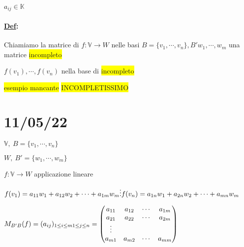 \documentclass{article}
\newcommand{\hl}[1]{\colorbox{yellow}{#1}}
\newcommand{\ul}[1]{\underline{#1}}
\newcommand{\K}{\mathbb{K}}
\newcommand{\V}{\mathbb{V}}
\newcommand{\Def}[2]{\paragraph{\ul{Def}:}#1\\\hspace*{3em}\begin{minipage}{.8\textwidth}#2\end{minipage}}
\begin{document}
$a_{ij}\in\K$

\Def{Chiamiamo la matrice di $f:\V\rightarrow W$ nelle basi $B=\{v_1,\cdots,v_n\},B'{w_1,\cdots,w_m}$ una matrice \hl{incompleto}}{
	$f(v_1),\cdots,f(v_n)$ nella base di \hl{incompleto}
}

\hl{esempio mancante}
\hl{INCOMPLETISSIMO}
\section{11/05/22}

$\V,\ B=\{v_1,\cdots,v_n\}$

$W,\ B'=\{w_1,\cdots,w_m\}$

$f:\V\rightarrow W$ applicazione lineare

$f(v_1)=a_{11}w_1+a_{12}w_2+\cdots+a_{1m}w_m
\\\vdots\\
f(v_n)=a_{1n}w_1+a_{2n}w_2+\cdots+a_{mn}w_m$

$M_{B'B}(f)=(a_{ij})_{1\le i\le m\\1\le j\le n}=\begin{pmatrix}
	a_{11} & a_{12} & \cdots & a_{1m} \\
	a_{21} & a_{22} & \cdots & a_{2m} \\
	\vdots                            \\
	a_{m1} & a_{m2} & \cdots & a_{mm}
\end{pmatrix}$
\end{document}
